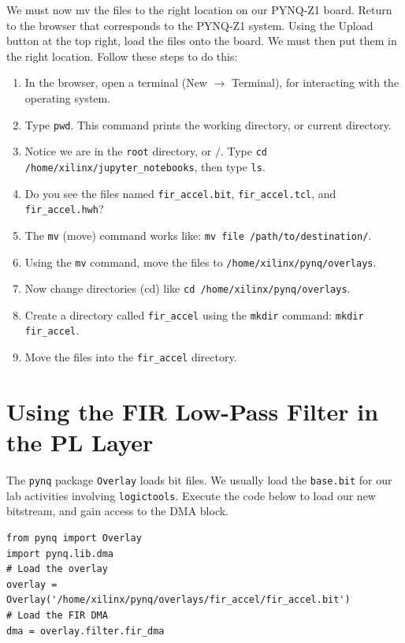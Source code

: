 \documentclass{article}
\begin{document}
\noindent
We must now mv the files to the right location on our PYNQ-Z1 board.  Return to the browser that corresponds to the PYNQ-Z1 system.  Using the Upload button at the top right, load the files onto the board.  We must then put them in the right location.  Follow these steps to do this:
\begin{enumerate}
\item In the browser, open a terminal (New $\rightarrow$ Terminal), for interacting with the operating system.
\item Type \verb+pwd+.  This command prints the working directory, or current directory.
\item Notice we are in the \verb+root+ directory, or $/$.  Type \verb+cd /home/xilinx/jupyter_notebooks+, then type \verb+ls+.
\item Do you see the files named \verb+fir_accel.bit+, \verb+fir_accel.tcl+, and \verb+fir_accel.hwh+? 
\item The \verb+mv+ (move) command works like: \verb+mv file /path/to/destination/+.
\item Using the \verb+mv+ command, move the files to \verb+/home/xilinx/pynq/overlays+.
\item Now change directories (cd) like \verb+cd /home/xilinx/pynq/overlays+.
\item Create a directory called \verb+fir_accel+ using the \verb+mkdir+ command: \verb+mkdir fir_accel+.
\item Move the files into the \verb+fir_accel+ directory.
\end{enumerate}

\clearpage

\section{Using the FIR Low-Pass Filter in the PL Layer}

The \verb+pynq+ package \verb+Overlay+ loads bit files.  We usually load the \verb+base.bit+ for our lab activities involving \verb+logictools+.  Execute the code below to load our new bitstream, and gain access to the DMA block.

\begin{verbatim}
from pynq import Overlay
import pynq.lib.dma
# Load the overlay
overlay = Overlay('/home/xilinx/pynq/overlays/fir_accel/fir_accel.bit')
# Load the FIR DMA
dma = overlay.filter.fir_dma
\end{verbatim}
\end{document}
